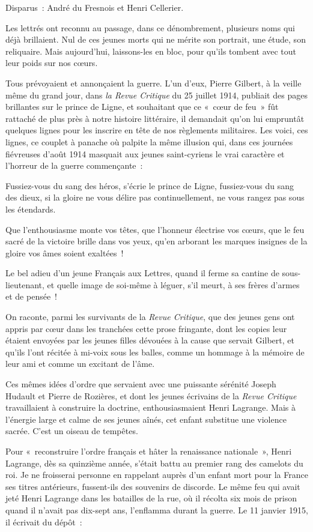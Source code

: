 \documentclass[french,twoside]{book} %
\newenvironment{quoteblock}%
  {\begin{quoting}}
  {\end{quoting}}
\newenvironment{quotebar}{%
    \def\FrameCommand{{\color{rubric!10!}\vrule width 0.5em} \hspace{0.9em}}%
    \def\OuterFrameSep{\itemsep} %
    \MakeFramed {\advance\hsize-\width \FrameRestore}
  }%
  {%
    \endMakeFramed
  }
\renewenvironment{quoteblock}%
  {%
    \savenotes
    \setstretch{0.9}
    \normalfont
    \begin{quotebar}
  }
  {%
    \end{quotebar}
    \spewnotes
  }
\begin{document}
Disparus : André du Fresnois et Henri Cellerier.‌\par
Les lettrés ont reconnu au passage, dans ce dénombrement, plusieurs noms qui déjà brillaient. Nul de ces jeunes morts qui ne mérite son portrait, une étude, son reliquaire. Mais aujourd’hui, laissons-les en bloc, pour qu’ils tombent avec tout leur poids sur nos cœurs.‌\par
Tous prévoyaient et annonçaient la guerre. L’un d’eux, Pierre Gilbert, à la veille même du grand jour, dans {\itshape la Revue Critique} du 25 juillet 1914, publiait des pages brillantes sur le prince de Ligne, et souhaitant que ce « cœur de feu » fût rattaché de plus près à notre histoire littéraire, il demandait qu’on lui empruntât quelques lignes pour les inscrire en tête de nos règlements militaires. Les voici, ces lignes, ce couplet à panache où palpite la même illusion qui, dans ces journées fiévreuses d’août 1914 masquait aux jeunes saint-cyriens le vrai caractère et l’horreur de la guerre commençante :‌\par

\begin{quoteblock}
 \noindent Fussiez-vous du sang des héros, s’écrie le prince de Ligne, fussiez-vous du sang des dieux, si la gloire ne vous délire pas continuellement, ne vous rangez pas sous les étendards.‌\par
 Que l’enthousiasme monte vos têtes, que l’honneur électrise vos cœurs, que le feu sacré de la victoire brille dans vos yeux, qu’en arborant les marques insignes de la gloire vos âmes soient exaltées !‌
 \end{quoteblock}

\noindent Le bel adieu d’un jeune Français aux Lettres, quand il ferme sa cantine de sous-lieutenant, et quelle image de soi-même à léguer, s’il meurt, à ses frères d’armes et de pensée !‌\par
On raconte, parmi les survivants de la {\itshape Revue Critique}, que des jeunes gens ont appris par cœur dans les tranchées cette prose fringante, dont les copies leur étaient envoyées par les jeunes filles dévouées à la cause que servait Gilbert, et qu’ils l’ont récitée à mi-voix sous les balles, comme un hommage à la mémoire de leur ami et comme un excitant de l’âme.‌\par
Ces mêmes idées d’ordre que servaient avec une puissante sérénité Joseph Hudault et Pierre de Rozières, et dont les jeunes écrivains de la {\itshape Revue Critique} travaillaient à construire la doctrine, enthousiasmaient Henri Lagrange. Mais à l’énergie large et calme de ses jeunes aînés, cet enfant substitue une violence sacrée. C’est un oiseau de tempêtes.‌\par
Pour « reconstruire l’ordre français et hâter la renaissance nationale », Henri Lagrange, dès sa quinzième année, s’était battu au premier rang des camelots du roi. Je ne froisserai personne en rappelant auprès d’un enfant mort pour la France ses titres antérieurs, fussent-ils des souvenirs de discorde. Le même feu qui avait jeté Henri Lagrange dans les batailles de la rue, où il récolta six mois de prison quand il n’avait pas dix-sept ans, l’enflamma durant la guerre. Le 11 janvier 1915, il écrivait du dépôt :‌\par
\end{document}

